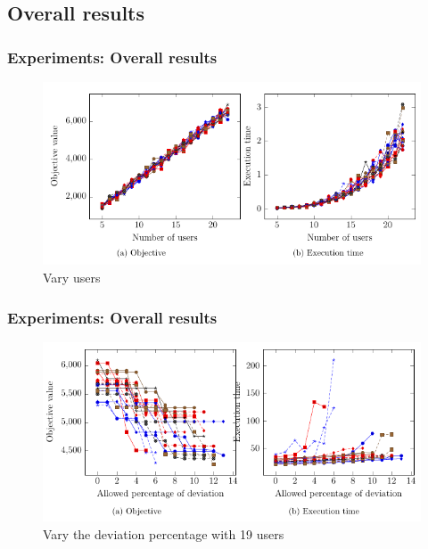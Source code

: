 \documentclass{beamer}
\begin{document}
	\subsection{Overall results}
	\begin{frame}
		\frametitle{Experiments: Overall results}
		\begin{figure}
			\centering
			\includegraphics[width=\textwidth]{img/compiledResults/12}
			\caption{Vary users}
		\end{figure}
	\end{frame}
	\begin{frame}
		\frametitle{Experiments: Overall results}
		\begin{figure}
			\centering
			\includegraphics[width=\textwidth]{img/compiledResults/7}
			\caption{Vary the deviation percentage with 19 users}
		\end{figure}
	\end{frame}
\end{document}
